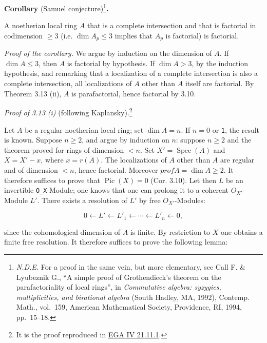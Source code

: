 \documentclass[
  11pt,
  a4paper,
]{book}
\begin{document}
\textbf{Corollary} (Samuel conjecture)\footnote{\emph{N.D.E.} For a
  proof in the same vein, but more elementary, see Call F. \& Lyubeznik
  G., ``A simple proof of Grothendieck's theorem on the parafactoriality
  of local rings'', in \emph{Commutative algebra: syzygies,
  multiplicities, and birational algebra} (South Hadley, MA, 1992),
  Contemp. Math., vol.~159, American Mathematical Society, Providence,
  RI, 1994, pp.~15--18.}\textbf{.}

A noetherian local ring \(A\) that is a complete intersection and that
is factorial in codimension \(\geqslant 3\) (i.e.
\(\dim A_{p} \leqslant 3\) implies that \(A_{p}\) is factorial) is
factorial.

\emph{Proof of the corollary.} We argue by induction on the dimension of
\(A\). If \(\dim A \leqslant 3\), then \(A\) is factorial by hypothesis.
If \(\dim A > 3\), by the induction hypothesis, and remarking that a
localization of a complete intersection is also a complete intersection,
all localizations of \(A\) other than \(A\) itself are factorial. By
Theorem 3.13 (ii), \(A\) is parafactorial, hence factorial by 3.10.

\emph{Proof of 3.13 (i)} (following Kaplansky).\footnote{It is the proof
  reproduced in
  \href{https://jcreinhold.github.io/ega/iv/34-ch4-21-divisors.html\#2111-factoriality-of-regular-local-rings}{EGA
  IV 21.11.1}.}

Let \(A\) be a regular noetherian local ring; set \(\dim A = n\). If
\(n = 0\) or \texttt{1}, the result is known. Suppose \(n
\geqslant 2\), and argue by induction on \(n\): suppose
\(n \geqslant 2\) and the theorem proved for rings of dimension \(<
n\). Set \(X' = \operatorname{Spec}(A)\) and \(X = X' - {x}\), where
\(x = r(A)\). The localizations of \(A\) other than \(A\) are regular
and of dimension \(< n\), hence factorial. Moreover
\(prof A = \dim A \geqslant 2\). It therefore suffices to prove that
\(\operatorname{Pic}(X) = 0\) (Cor. 3.10). Let then \(L\) be an
invertible \texttt{O\_X}-Module; one knows that one can prolong it to a
coherent \(O_{X'}\)-Module \(L'\). There exists a resolution of \(L'\)
by free \(O_{X'}\)-Modules:

\[ 0 \longleftarrow L' \longleftarrow L'_{1} \longleftarrow \cdots \longleftarrow L'_{n} \longleftarrow 0, \]

since the cohomological dimension of \(A\) is finite. By restriction to
\(X\) one obtains a finite free resolution. It therefore suffices to
prove the following lemma:
\end{document}

